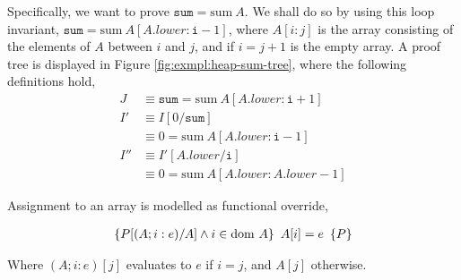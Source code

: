 \begin{example}
  Specifically, we want to prove $\mathtt{sum} = \mathrm{sum}~A$. We
  shall do so by using this loop invariant, $\mathtt{sum} =
  \mathrm{sum}~A[A.lower : \mathtt{i} - 1]$, where $A[i:j]$ is the
  array consisting of the elements of $A$ between $i$ and $j$, and if
  $i = j + 1$ is the empty array. A proof tree is displayed in Figure
  \ref{fig:exmpl:heap-sum-tree}, where the following definitions hold,
  \begin{align*}
    J &\equiv \mathtt{sum} = \mathrm{sum}~A[A.lower : \mathtt{i} + 1]\\
    I' &\equiv I[0/\mathtt{sum}]\\
    &\equiv 0 = \mathrm{sum}~A[A.lower : \mathtt{i} - 1]\\
    I'' &\equiv I'[A.lower/\mathtt{i}]\\
    &\equiv 0 = \mathrm{sum}~A[A.lower : A.lower - 1]
  \end{align*}
\end{example}

\begin{definition}
  Assignment to an array is modelled as functional override,

  \begin{align*}
    \left\{P[(A; i : e)/A] \land i \in \mathrm{dom}~A\right\}\ A[i] = e\ \left\{P\right\}
  \end{align*}

  Where $(A; i : e)[j]$ evaluates to $e$ if $i = j$, and $A[j]$
  otherwise.
\end{definition}

